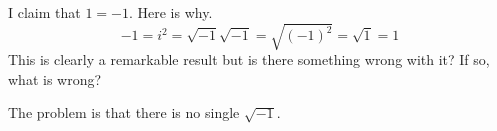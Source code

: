 \begin{enumialphparenastyle}
\begin{ex} I claim that $1=-1$. Here is why.
\begin{equation*}
-1=i^{2}=\sqrt{-1}\sqrt{-1}=\sqrt{(-1) ^{2}}=\sqrt{1}=1
\end{equation*}
This is clearly a remarkable result but is there something wrong with it? If
so, what is wrong? 
\begin{sol}
The problem is that there is no single $\sqrt{-1}$.
\end{sol}
\end{ex}

\end{enumialphparenastyle}
